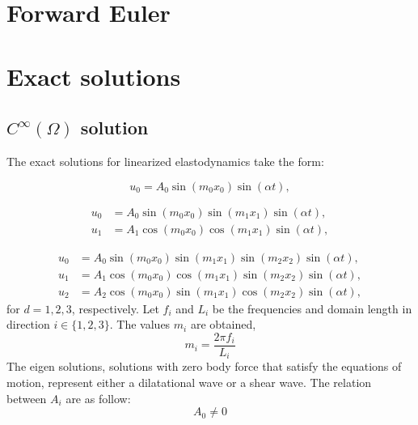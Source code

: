 \documentclass[12pt]{article}
\begin{document}
\section{Forward Euler}


\section{Exact solutions}


\subsection{$C^\infty(\Omega)$ solution}

The exact solutions for linearized elastodynamics take the form:

\begin{equation}
u_0 = A_0 \sin (m_0 x_0) \sin (\alpha t),
\end{equation}

\begin{subequations}
\begin{align}
u_0 &= A_0 \sin (m_0 x_0) \sin (m_1 x_1) \sin (\alpha t), \\
u_1 &= A_1 \cos (m_0 x_0) \cos (m_1 x_1) \sin (\alpha t), 
\end{align}
\end{subequations}

\begin{subequations}
\begin{align}
u_0 &= A_0 \sin (m_0 x_0) \sin (m_1 x_1) \sin (m_2 x_2) \sin (\alpha t), \\
u_1 &= A_1 \cos (m_0 x_0) \cos (m_1 x_1) \sin (m_2 x_2) \sin (\alpha t), \\
u_2 &= A_2 \cos (m_0 x_0) \sin (m_1 x_1) \cos (m_2 x_2) \sin (\alpha t), 
\end{align}
\end{subequations}
%
for $d = 1, 2, 3$, respectively. Let $f_i$ and $L_i$ be the frequencies and domain length in direction $i \in \{1, 2, 3\}$. The values $m_i$ are obtained,
%
\begin{equation}
m_i = \frac{2 \pi f_i}{L_i}
\end{equation}
% 
The eigen solutions, solutions with zero body force that satisfy the equations of motion, represent either a dilatational wave or a shear wave. The relation between $A_i$ are as follow:
%
\begin{equation}
A_0 \neq 0
\end{equation}
\end{document}
